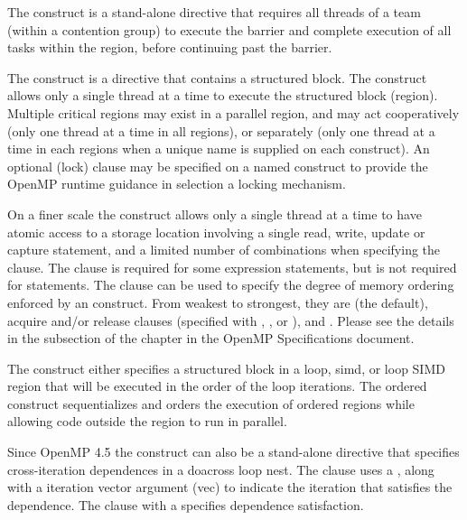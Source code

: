 \label{chap:synchronization}

The  construct is a stand-alone directive that requires all threads
of a team (within a contention group) to execute the barrier and complete
execution of all tasks within the region, before continuing past the barrier.

The  construct is a directive that contains a structured block. 
The construct allows only a single thread at a time to execute the structured block (region).
Multiple critical regions may exist in a parallel region, and may
act cooperatively (only one thread at a time in all  regions),
or separately (only one thread at a time in each  regions when
a unique name is supplied on each  construct).
An optional (lock)  clause may be specified on a named  
construct to provide the OpenMP runtime guidance in selection a locking 
mechanism.

On a finer scale the  construct allows only a single thread at 
a time to have atomic access to a storage location involving a single read, 
write, update or capture statement, and a limited number of combinations 
when specifying the   clause.  The
 clause is required for some expression statements, but is
not required for  statements. The  clause can be
used to specify the degree of memory ordering enforced by an 
construct. From weakest to strongest, they are  (the default),
acquire and/or release clauses (specified with , ,
or ), and .  Please see the details in the
 subsection of the  chapter in the OpenMP
Specifications document.

The  construct either specifies a structured block in a loop, 
simd, or loop SIMD region that will be executed in the order of the loop 
iterations.  The ordered construct sequentializes and orders the execution 
of ordered regions while allowing code outside the region to run in parallel.

Since OpenMP 4.5 the  construct can also be a stand-alone 
directive that specifies cross-iteration dependences in a doacross loop nest.  
The  clause uses a  , along with a 
iteration vector argument (vec) to indicate the iteration that satisfies the 
dependence.  The  clause with a 
 specifies dependence satisfaction.

